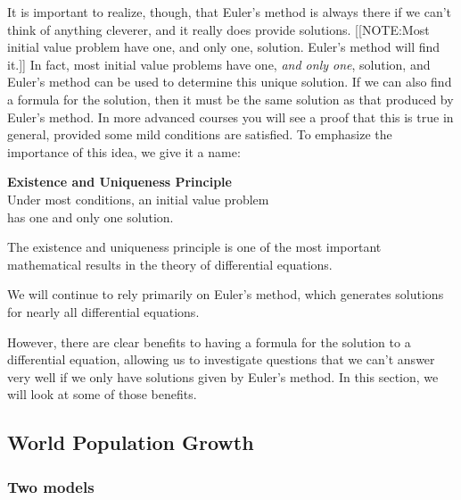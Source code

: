 It is important to realize, though, that Euler's method is always
there if we can't think of anything cleverer, and it really does
provide solutions.
[[NOTE:Most initial value problem have one,  and only one, solution.  Euler's method  will find it.]]
In fact, most initial value problems have one, {\em and only one},
solution, and Euler's method can be used to determine this unique
solution. If we can also find a formula for the solution, then it must
be the same solution as that produced by Euler's method.  In more
advanced courses you will see a proof that this is true in general,
provided some mild conditions are satisfied.  To emphasize the
importance of this idea, we give it a name:
\begin{observation}

{\bf Existence and Uniqueness Principle} \\
Under most conditions, an initial value problem  \\
has one and only one solution.
\end{observation}
The existence and uniqueness principle  is one of the most important mathematical results in the
theory of differential equations.

We will continue to rely primarily on Euler's method, which generates
solutions for nearly all differential equations.

However, there are clear benefits to having a formula for the solution
to a differential equation, allowing us to investigate questions that
we can't answer very well if we only have solutions given by Euler's
method.  In this section, we will look at some of those benefits.


\subsection{World Population Growth}
\label{subsec:world-population-growth}

\subsubsection{Two models}
\label{subsubsec:two-models}

